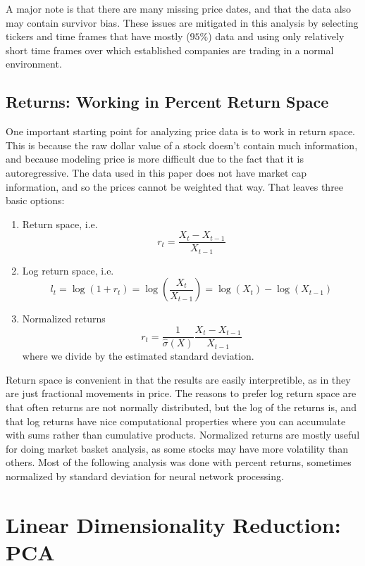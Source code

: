 \documentclass{article}
\begin{document}
A major note is that there are many missing price dates, and that the data also may
contain survivor bias. These issues are mitigated in this analysis by selecting
tickers and time frames that have mostly ($95\%$) data and using only relatively
short time frames over which established companies are trading in a normal environment.

\subsection{Returns: Working in Percent Return Space}

One important starting point for analyzing price data is to work in return space.
This is because the raw dollar value of a stock doesn't contain much information,
and because modeling price is more difficult due to the fact that it is 
autoregressive. The data used in this paper does not have market cap 
information, and so the prices
cannot be weighted that way. That leaves three basic options:

\begin{enumerate}
    \item
        Return space, i.e.
        \[ r_t = \frac{X_t - X_{t-1}}{X_{t-1}} \]
    \item
        Log return space, i.e.
        \[ l_t = \log\left( 1+ r_t \right) = \log\left( \frac{X_t}{X_{t-1}} \right) = \log(X_t) - \log(X_{t-1}) \] 
    \item
        Normalized returns
        \[ r_{t} = \frac{1}{\hat{\sigma}(X)} \frac{X_t - X_{t-1}}{X_{t-1}} \]
        where we divide by the estimated standard deviation.
\end{enumerate}

Return space is convenient in that the results are easily interpretible, as in they are
just fractional movements in price. The reasons to prefer log return space are that
often returns are not normally distributed, but the log of the returns is, and that
log returns have nice computational properties where you can accumulate with sums
rather than cumulative products. Normalized returns are mostly useful for doing
market basket analysis, as some stocks may have more volatility than others. Most
of the following analysis was done with percent returns, sometimes normalized
by standard deviation for neural network processing.

\section{Linear Dimensionality Reduction: PCA}
\end{document}
